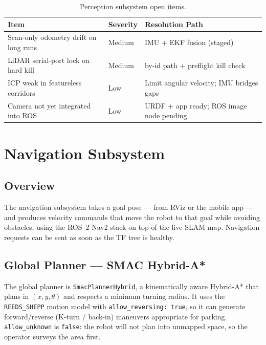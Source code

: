 \documentclass[12pt,a4paper]{report}
\begin{document}
\begin{table}[H]
\centering
\caption{Perception subsystem open items.}
\label{tab:perc_limits}
\begin{tabularx}{\textwidth}{|p{3.8cm}|p{1.4cm}|X|}
\hline
\textbf{Item} & \textbf{Severity} & \textbf{Resolution Path} \\
\hline
Scan-only odometry drift on long runs & Medium & IMU + EKF fusion (staged) \\
\hline
LiDAR serial-port lock on hard kill & Medium & by-id path + preflight kill check \\
\hline
ICP weak in featureless corridors & Low & Limit angular velocity; IMU bridges gaps \\
\hline
Camera not yet integrated into ROS & Low & URDF + app ready; ROS image node pending \\
\hline
\end{tabularx}
\end{table}

\chapter{Navigation Subsystem}
\label{ch:navigation}

\section{Overview}

The navigation subsystem takes a goal pose --- from RViz or the mobile app ---
and produces velocity commands that move the robot to that goal while avoiding
obstacles, using the ROS~2 Nav2 stack on top of the live SLAM map. Navigation
requests can be sent as soon as the TF tree is healthy.

\section{Global Planner --- SMAC Hybrid-A*}

The global planner is \texttt{SmacPlannerHybrid}, a kinematically aware Hybrid-A*
that plans in $(x, y, \theta)$ and respects a minimum turning radius. It uses the
\texttt{REEDS\_SHEPP} motion model with \texttt{allow\_reversing: true}, so it can
generate forward/reverse (K-turn / back-in) maneuvers appropriate for parking.
\texttt{allow\_unknown} is \texttt{false}: the robot will not plan into unmapped
space, so the operator surveys the area first.
\end{document}
